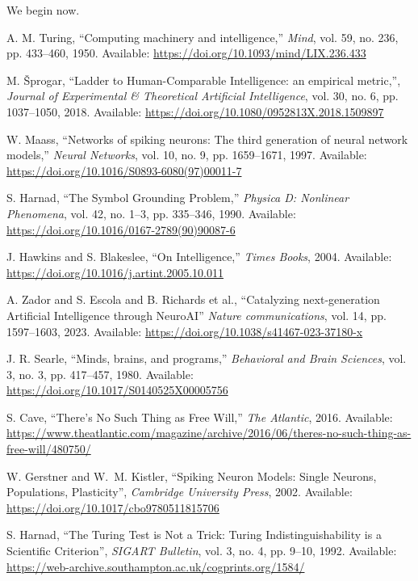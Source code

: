 \documentclass{article}
\newenvironment{ttquote}{
	\begin{minipage}[t]{0.9\linewidth}
		\ttfamily
		\setlength{\parindent}{0pt}   %
		\setlength{\parskip}{0.7em}   %
	}{
	\end{minipage}
}
\begin{document}
\begin{ttquote}
		
		We begin now.
	\end{ttquote}
	
	\newpage
	
	\begin{thebibliography}{99}
		
		A. M. Turing, 
		``Computing machinery and intelligence,'' 
		\textit{Mind}, vol. 59, no. 236, pp. 433--460, 1950. Available: \url{https://doi.org/10.1093/mind/LIX.236.433}
		
		M. Šprogar, 
		``Ladder to Human-Comparable Intelligence: an empirical metric,'', 
		\textit{Journal of Experimental \& Theoretical Artificial Intelligence},
		vol. 30, no. 6, pp. 1037--1050, 2018. Available: \url{https://doi.org/10.1080/0952813X.2018.1509897}
		
		W. Maass, 
		``Networks of spiking neurons: The third generation of neural network models,'' 
		\textit{Neural Networks}, vol. 10, no. 9, pp. 1659--1671, 1997. Available: \url{https://doi.org/10.1016/S0893-6080(97)00011-7}
		
		S. Harnad, 
		``The Symbol Grounding Problem,'' 
		\textit{Physica D: Nonlinear Phenomena}, vol. 42, no. 1--3, pp. 335--346, 1990. Available: \url{https://doi.org/10.1016/0167-2789(90)90087-6}
		
		J. Hawkins and S. Blakeslee,
		``On Intelligence,'' 
		\textit{Times Books}, 2004. Available: \url{https://doi.org/10.1016/j.artint.2005.10.011}
		
		A. Zador and S. Escola and B. Richards et al.,
		``Catalyzing next-generation Artificial Intelligence through NeuroAI''
		\textit{Nature communications}, vol. 14, pp. 1597--1603, 2023. Available:
		\url{https://doi.org/10.1038/s41467-023-37180-x}
		
		J. R. Searle, 
		``Minds, brains, and programs,'' 
		\textit{Behavioral and Brain Sciences}, vol. 3, no. 3, pp. 417--457, 1980. Available: \url{https://doi.org/10.1017/S0140525X00005756}
		
		S. Cave, 
		``There’s No Such Thing as Free Will,''
		\textit{The Atlantic},
		2016. Available: \url{https://www.theatlantic.com/magazine/archive/2016/06/theres-no-such-thing-as-free-will/480750/}
		
		W. Gerstner and W.~M. Kistler,
		``Spiking Neuron Models: Single Neurons, Populations, Plasticity'',
		\textit{Cambridge University Press}, 2002. Available:
		\url{https://doi.org/10.1017/cbo9780511815706}
		
		S. Harnad,
		``The Turing Test is Not a Trick: Turing Indistinguishability is a Scientific Criterion'',
		\textit{SIGART Bulletin}, vol. 3, no. 4, pp. 9--10, 1992. Available: \url{https://web-archive.southampton.ac.uk/cogprints.org/1584/}
		
		
	\end{thebibliography}
\end{document}
